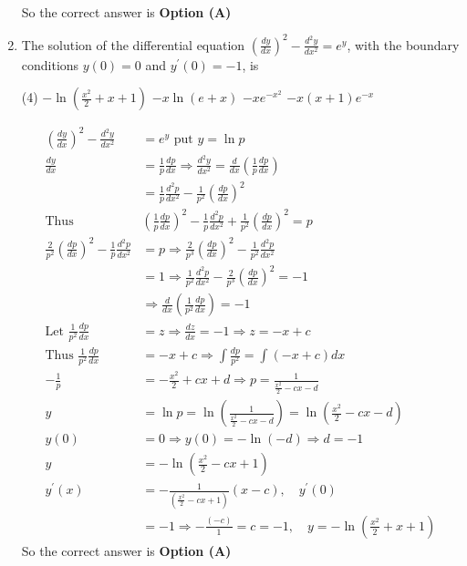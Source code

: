 \begin{enumerate}[label=\color{ocre}\textbf{\arabic*.}]
\begin{answer}
\begin{align*}
		\end{align*}
		So the correct answer is \textbf{Option (A)}
	\end{answer}
	\item The solution of the differential equation $\left(\frac{d y}{d x}\right)^{2}-\frac{d^{2} y}{d x^{2}}=e^{y}$, with the boundary conditions $y(0)=0$ and $y^{\prime}(0)=-1$, is
	{}
	\begin{tasks}(4)
		\task[\textbf{A.}] $-\ln \left(\frac{x^{2}}{2}+x+1\right)$
		\task[\textbf{B.}] $-x \ln (e+x)$
		\task[\textbf{C.}] $-x e^{-x^{2}}$
		\task[\textbf{D.}]  $-x(x+1) e^{-x}$
	\end{tasks}
	\begin{answer}
		\begin{align*}
		\left(\frac{d y}{d x}\right)^{2}-\frac{d^{2} y}{d x^{2}}&=e^{y}\text{ put }y=\ln p\\
		\frac{d y}{d x}&=\frac{1}{p} \frac{d p}{d x} \Rightarrow \frac{d^{2} y}{d x^{2}}=\frac{d}{d x}\left(\frac{1}{p} \frac{d p}{d x}\right)\\&=\frac{1}{p} \frac{d^{2} p}{d x^{2}}-\frac{1}{p^{2}}\left(\frac{d p}{d x}\right)^{2}\\
		\text{Thus }&\left(\frac{1}{p} \frac{d p}{d x}\right)^{2}-\frac{1}{p} \frac{d^{2} p}{d x^{2}}+\frac{1}{p^{2}}\left(\frac{d p}{d x}\right)^{2}=p\\
		\frac{2}{p^{2}}\left(\frac{d p}{d x}\right)^{2}-\frac{1}{p} \frac{d^{2} p}{d x^{2}}&=p \Rightarrow \frac{2}{p^{3}}\left(\frac{d p}{d x}\right)^{2}-\frac{1}{p^{2}} \frac{d^{2} p}{d x^{2}}\\&=1 \Rightarrow \frac{1}{p^{2}} \frac{d^{2} p}{d x^{2}}-\frac{2}{p^{3}}\left(\frac{d p}{d x}\right)^{2}=-1\\
		&\Rightarrow \frac{d}{d x}\left(\frac{1}{p^{2}} \frac{d p}{d x}\right)=-1\\
		\text{Let }\frac{1}{p^{2}} \frac{d p}{d x}&=z \Rightarrow \frac{d z}{d x}=-1 \Rightarrow z=-x+c\\
		\text{Thus }\frac{1}{p^{2}} \frac{d p}{d x}&=-x+c \Rightarrow \int \frac{d p}{p^{2}}=\int(-x+c) d x\\
		-\frac{1}{p}&=-\frac{x^{2}}{2}+c x+d \Rightarrow p=\frac{1}{\frac{x^{2}}{2}-c x-d}\\
		y&=\ln p=\ln \left(\frac{1}{\frac{x^{2}}{2}-c x-d}\right)=\ln \left(\frac{x^{2}}{2}-c x-d\right)\\
		y(0)&=0 \Rightarrow y(0)=-\ln (-d) \Rightarrow d=-1\\
		y&=-\ln \left(\frac{x^{2}}{2}-c x+1\right)\\
		y^{\prime}(x)&=-\frac{1}{\left(\frac{x^{2}}{2}-c x+1\right)}(x-c), \quad y^{\prime}(0)\\&=-1 \Rightarrow-\frac{(-c)}{1}=c=-1, \quad y=-\ln \left(\frac{x^{2}}{2}+x+1\right)
		\end{align*}
		So the correct answer is \textbf{Option (A)}
	\end{answer}
\end{enumerate}
